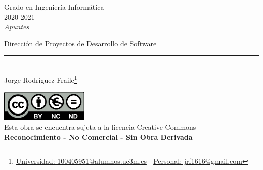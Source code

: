 \documentclass[12pt]{report} %
\begin{document}
	
\begin{titlepage}
	\begin{sffamily}
	\color{azulUC3M}
	\begin{center}
		\begin{figure}[H] %
		\end{figure}
		\vspace{2.5cm}
		\begin{Large}
			Grado en Ingeniería Informática\\			
			2020-2021\\
			\vspace{2cm}		
			\textsl{Apuntes}\\
			\bigskip
		\end{Large}
		 	{\Huge Dirección de Proyectos de Desarrollo de Software}\\
		 	\vspace*{0.5cm}
	 		\rule{10.5cm}{0.1mm}\\
			\vspace*{0.9cm}
			{\LARGE Jorge Rodríguez Fraile\footnote{\href{mailto:100405951@alumnos.uc3m.es}{Universidad: 100405951@alumnos.uc3m.es}  |  \href{mailto:jrf1616@gmail.com}{Personal: jrf1616@gmail.com}}}\\ 
			\vspace*{1cm}
	\end{center}
	\vfill
	\color{black}
		\includegraphics[width=4.2cm]{img/creativecommons.png}\\
		Esta obra se encuentra sujeta a la licencia Creative Commons\\ \textbf{Reconocimiento - No Comercial - Sin Obra Derivada}
	\end{sffamily}
\end{titlepage}


\tableofcontents
\thispagestyle{fancy}
\end{document}
